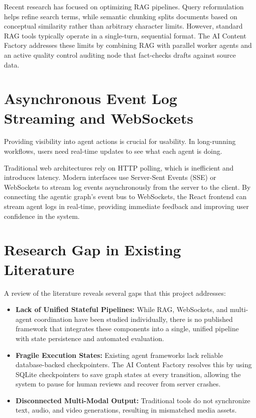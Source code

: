 Recent research has focused on optimizing RAG pipelines. Query reformulation helps refine search terms, while semantic chunking splits documents based on conceptual similarity rather than arbitrary character limits. However, standard RAG tools typically operate in a single-turn, sequential format. The AI Content Factory addresses these limits by combining RAG with parallel worker agents and an active quality control auditing node that fact-checks drafts against source data.

\section{Asynchronous Event Log Streaming and WebSockets}

Providing visibility into agent actions is crucial for usability. In long-running workflows, users need real-time updates to see what each agent is doing.

Traditional web architectures rely on HTTP polling, which is inefficient and introduces latency. Modern interfaces use Server-Sent Events (SSE) or WebSockets to stream log events asynchronously from the server to the client. By connecting the agentic graph's event bus to WebSockets, the React frontend can stream agent logs in real-time, providing immediate feedback and improving user confidence in the system.

\section{Research Gap in Existing Literature}

A review of the literature reveals several gaps that this project addresses:
\begin{itemize}
    \item \textbf{Lack of Unified Stateful Pipelines:} While RAG, WebSockets, and multi-agent coordination have been studied individually, there is no published framework that integrates these components into a single, unified pipeline with state persistence and automated evaluation.
    \item \textbf{Fragile Execution States:} Existing agent frameworks lack reliable database-backed checkpointers. The AI Content Factory resolves this by using SQLite checkpointers to save graph states at every transition, allowing the system to pause for human reviews and recover from server crashes.
    \item \textbf{Disconnected Multi-Modal Output:} Traditional tools do not synchronize text, audio, and video generations, resulting in mismatched media assets.
\end{itemize}

